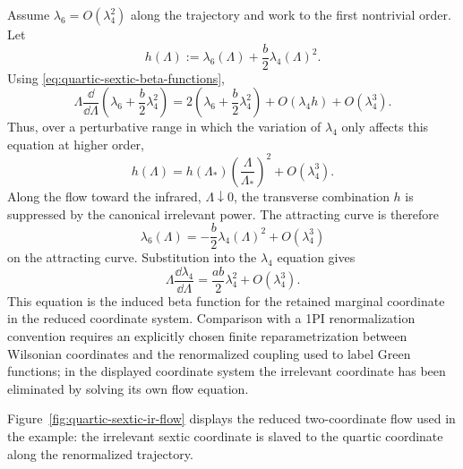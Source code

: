 Assume \(\lambda_6=O(\lambda_4^2)\) along the trajectory and work to the first
nontrivial order.  Let
\[
  h(\Lambda):=\lambda_6(\Lambda)+\frac b2\lambda_4(\Lambda)^2 .
\]
Using \eqref{eq:quartic-sextic-beta-functions},
\begin{equation}
  \Lambda\frac{\dd}{\dd\Lambda}
  \left(\lambda_6+\frac b2\lambda_4^2\right)
  =
  2\left(\lambda_6+\frac b2\lambda_4^2\right)
  +O(\lambda_4h)+O(\lambda_4^3).
  \label{eq:slaving-combination}
\end{equation}
Thus, over a perturbative range in which the variation of \(\lambda_4\) only
affects this equation at higher order,
\[
  h(\Lambda)
  =
  h(\Lambda_*)\left(\frac{\Lambda}{\Lambda_*}\right)^2
  +O(\lambda_4^3).
\]
Along the flow toward the infrared, \(\Lambda\downarrow0\), the transverse
combination \(h\) is suppressed by the canonical irrelevant power.  The
attracting curve is therefore
\begin{equation}
  \lambda_6(\Lambda)
  =
  -\frac b2\lambda_4(\Lambda)^2+O(\lambda_4^3)
  \label{eq:lambda-six-slaved}
\end{equation}
on the attracting curve.  Substitution into the \(\lambda_4\) equation gives
\begin{equation}
  \Lambda\frac{\dd\lambda_4}{\dd\Lambda}
  =
  \frac{ab}{2}\lambda_4^2+O(\lambda_4^3).
  \label{eq:lambda-four-induced-beta}
\end{equation}
This equation is the induced beta function for the retained marginal
coordinate in the reduced coordinate system.  Comparison with a 1PI
renormalization convention requires an explicitly chosen finite
reparametrization between Wilsonian coordinates and the renormalized coupling
used to label Green functions; in the displayed coordinate system the
irrelevant coordinate has been eliminated by solving its own flow equation.

Figure~\ref{fig:quartic-sextic-ir-flow} displays the reduced two-coordinate flow
used in the example: the irrelevant sextic coordinate is slaved to the quartic
coordinate along the renormalized trajectory.

